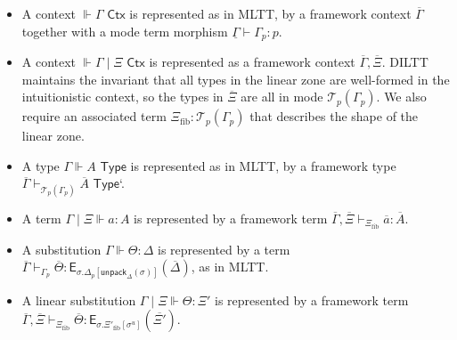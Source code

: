 \documentclass[10pt]{article}
\theoremstyle{definition}
\newcommand{\yields}{\vdash}
\newcommand{\CTX}{\,\,\mathsf{Ctx}}
\newcommand{\TYPE}{\,\,\mathsf{Type}}
\newcommand\E[2]{\ensuremath{\mathsf{E}_{#1}(#2)}}
\newcommand\El[2]{\mathcal{T}_{#1}(#2)}
\newcommand\unpack[2]{\ensuremath{\mathsf{unpack}_{#1}(#2)}}
\newcommand\unp[2]{\ensuremath{{#2}^u}}
\newcommand{\modeof}[1]{{#1}_p}
\newcommand{\qyields}{\Vdash}
\newcommand{\upstairs}[1]{\overline{#1}}
\newcommand{\downstairs}[1]{\underline{#1}}
\newcommand{\fibshape}[1]{\ensuremath{{#1}_{\mathrm{fib}}}}
\begin{document}
\begin{itemize}
\item A context $\qyields \Gamma \CTX$ is represented as in MLTT, by a framework context $\upstairs{\Gamma}$  together with a mode term morphism $\downstairs{\Gamma} \yields \modeof{\Gamma} : p$.
\item A context $\qyields \Gamma \mid \Xi \CTX$ is represented as a framework context $\upstairs{\Gamma}, \upstairs{\Xi}$. DILTT maintains the invariant that all types in the linear zone are well-formed in the intuitionistic context, so the types in $\upstairs{\Xi}$ are all in mode $\El{p}{\modeof{\Gamma}}$. We also require an associated term $\fibshape{\Xi} : \El{p}{\modeof{\Gamma}}$ that describes the shape of the linear zone.
\item A type $\Gamma \qyields A \TYPE$ is represented as in MLTT, by a framework type $\upstairs{\Gamma} \yields_{\El{p}{\modeof{\Gamma}}} \upstairs{A} \TYPE$`.
\item A term $\Gamma \mid \Xi \qyields a : A$ is represented by a framework term $\upstairs{\Gamma}, \upstairs{\Xi} \yields_{\fibshape{\Xi}} \upstairs{a} : \upstairs{A}$.
\item A substitution $\Gamma \qyields \Theta : \Delta$ is represented by a term $\upstairs{\Gamma} \yields_{\modeof{\Gamma}} \upstairs{\Theta} : \E{\sigma.\modeof{\Delta}[\unpack{\Delta}{\sigma}]}{\upstairs{\Delta}}$, as in MLTT.
\item A linear substitution $\Gamma \mid \Xi \qyields \Theta : \Xi'$ is represented by a framework term $\upstairs{\Gamma}, \upstairs{\Xi} \yields_{\fibshape{\Xi}} \upstairs{\Theta} : \E{\sigma.\fibshape{\Xi'}[\unp{\Xi'}{\sigma}]}{\upstairs{\Xi'}}$.
\end{itemize}
\end{document}
